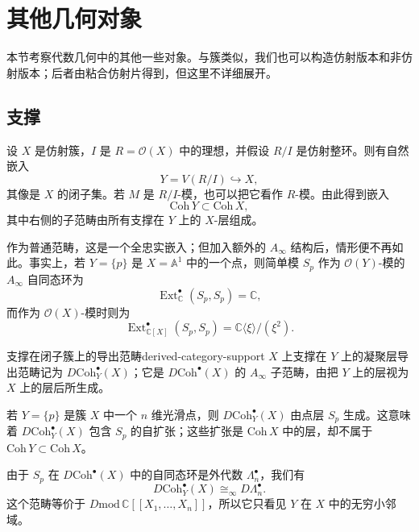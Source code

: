 \section{其他几何对象}\label{sec:other-geometrical-objects}
本节考察代数几何中的其他一些对象。与簇类似，我们也可以构造仿射版本和非仿射版本；后者由粘合仿射片得到，但这里不详细展开。

\subsection{支撑}\label{subsec:support}
设 $X$ 是仿射簇，$I$ 是 $R=\mathcal O(X)$ 中的理想，并假设 $R/I$ 是仿射整环。则有自然嵌入
\[
  Y=V(R/I)\hookrightarrow X,
\]
其像是 $X$ 的闭子集。若 $M$ 是 $R/I$-模，也可以把它看作 $R$-模。由此得到嵌入
\[
  \mathrm{Coh}\,Y\subset\mathrm{Coh}\,X,
\]
其中右侧的子范畴由所有支撑在 $Y$ 上的 $X$-层组成。

作为普通范畴，这是一个全忠实嵌入；但加入额外的 $A_\infty$ 结构后，情形便不再如此。事实上，若 $Y=\{p\}$ 是 $X=\mathbb A^1$ 中的一个点，则简单模 $S_p$ 作为 $\mathcal O(Y)$-模的 $A_\infty$ 自同态环为
\[
  \operatorname{Ext}^{\bullet}_{\mathbb C}(S_p,S_p)=\mathbb C,
\]
而作为 $\mathcal O(X)$-模时则为
\[
  \operatorname{Ext}^{\bullet}_{\mathbb C[X]}(S_p,S_p)
  =\mathbb C\langle\xi\rangle/(\xi^2).
\]

\begin{definition}{支撑在闭子簇上的导出范畴}{derived-category-support}
$X$ 上支撑在 $Y$ 上的凝聚层导出范畴记为 $D\mathrm{Coh}^{\bullet}_Y(X)$；它是 $D\mathrm{Coh}^{\bullet}(X)$ 的 $A_\infty$ 子范畴，由把 $Y$ 上的层视为 $X$ 上的层后所生成。
\end{definition}

\begin{example}[光滑点的无穷小邻域]
若 $Y=\{p\}$ 是簇 $X$ 中一个 $n$ 维光滑点，则 $D\mathrm{Coh}^{\bullet}_Y(X)$ 由点层 $S_p$ 生成。这意味着 $D\mathrm{Coh}^{\bullet}_Y(X)$ 包含 $S_p$ 的自扩张；这些扩张是 $\mathrm{Coh}\,X$ 中的层，却不属于 $\mathrm{Coh}\,Y\subset\mathrm{Coh}\,X$。

由于 $S_p$ 在 $D\mathrm{Coh}^{\bullet}(X)$ 中的自同态环是外代数 $\Lambda^\bullet_n$，我们有
\[
  D\mathrm{Coh}^{\bullet}_Y(X)\cong_\infty D\Lambda^\bullet_n.
\]
这个范畴等价于 $D\mathrm{mod}\,\mathbb C[[X_1,\ldots,X_n]]$，所以它只看见 $Y$ 在 $X$ 中的无穷小邻域。
\end{example}

